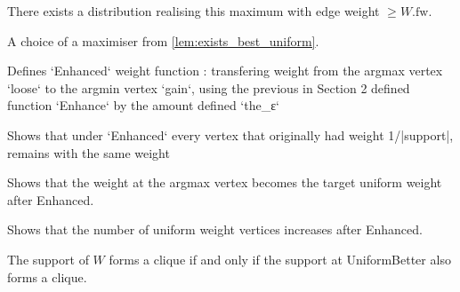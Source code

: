 \begin{lemma}
  \label{lem:exists_best_uniform}
  \leanok
  There exists a distribution realising this maximum with edge weight $\ge W.\mathrm{fw}$.
\end{lemma}

\begin{definition}[UniformBetter]
  \label{def:UniformBetter}
  \leanok
  A choice of a maximiser from \autoref{lem:exists_best_uniform}.
\end{definition}

\begin{definition}[Enhanced]
  \label{def:Enhanced}
  \leanok
  Defines `Enhanced` weight function : transfering weight from the argmax vertex `loose` to the argmin vertex `gain`, using the previous in Section 2 defined function `Enhance` by the amount defined `the_ε`
\end{definition}

\begin{lemma}
    \label{lem:Enhanced_unaffected}
    Shows that under `Enhanced` every vertex that originally had weight 1/|support|, remains with the same weight
\end{lemma}

\begin{lemma}
    \label{lem:Enhanced_effect_argmax}
    Shows that the weight at the argmax vertex becomes the target uniform weight after Enhanced.
\end{lemma}

\begin{lemma}
    \label{lem:Enhanced_inc_uniform_count}
    Shows that the number of uniform weight vertices increases after Enhanced.
\end{lemma}

\begin{lemma}
    \label{lem:UniformBetter_support_equiv}
    \leanok
    The support of $W$ forms a clique if and only if the support at UniformBetter also forms a clique.
\end{lemma}

